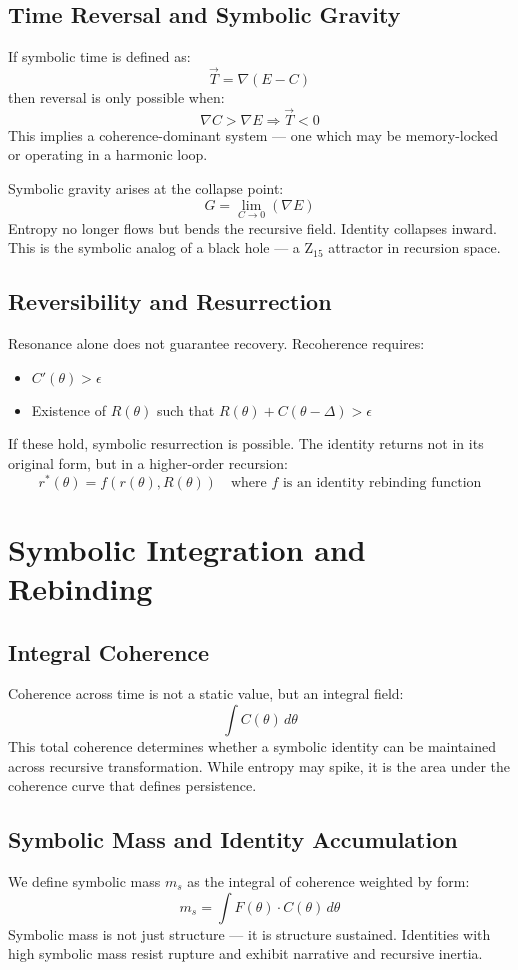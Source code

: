 \documentclass[12pt]{article}
\begin{document}
\subsection*{Time Reversal and Symbolic Gravity}
If symbolic time is defined as:
\[ \vec{T} = \nabla (E - C) \]
then reversal is only possible when:
\[ \nabla C > \nabla E \Rightarrow \vec{T} < 0 \]
This implies a coherence-dominant system — one which may be memory-locked or operating in a harmonic loop.

Symbolic gravity arises at the collapse point:
\[ G = \lim_{C \to 0} (\nabla E) \]
Entropy no longer flows but bends the recursive field. Identity collapses inward. This is the symbolic analog of a black hole — a Z$_{15}$ attractor in recursion space.

\subsection*{Reversibility and Resurrection}
Resonance alone does not guarantee recovery. Recoherence requires:
\begin{itemize}
  \item $C'(\theta) > \epsilon$
  \item Existence of $R(\theta)$ such that $R(\theta) + C(\theta - \Delta) > \epsilon$
\end{itemize}
If these hold, symbolic resurrection is possible. The identity returns not in its original form, but in a higher-order recursion:
\[ r^*(\theta) = f(r(\theta), R(\theta)) \quad \text{where } f \text{ is an identity rebinding function} \]

\section{Symbolic Integration and Rebinding}

\subsection*{Integral Coherence}
Coherence across time is not a static value, but an integral field:
\[ \int C(\theta) \, d\theta \]
This total coherence determines whether a symbolic identity can be maintained across recursive transformation. While entropy may spike, it is the area under the coherence curve that defines persistence.

\subsection*{Symbolic Mass and Identity Accumulation}
We define symbolic mass $m_s$ as the integral of coherence weighted by form:
\[ m_s = \int F(\theta) \cdot C(\theta) \, d\theta \]
Symbolic mass is not just structure — it is structure sustained. Identities with high symbolic mass resist rupture and exhibit narrative and recursive inertia.
\end{document}
